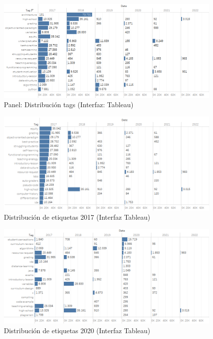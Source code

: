 \documentclass[a4paper, 12pt]{book}
\begin{document}
\begin{figure}[ht]
    \centering
    \includegraphics[width=\textwidth]{img/cse/tags_distrib.png}
    \caption{Panel: Distribución tags (Interfaz: Tableau)}
    \label{figura:dist_tags}
\end{figure}

\begin{figure}[ht]
    \centering
    \includegraphics[width=\textwidth]{img/cse/tags_2017.png}
    \caption{ Distribución de etiquetas 2017 (Interfaz Tableau)}
    \label{figura:tags_2017}
\end{figure}

\begin{figure}[ht]
    \centering
    \includegraphics[width=\textwidth]{img/cse/tags_2020.png}
    \caption{ Distribución de etiquetas 2020 (Interfaz Tableau)}
    \label{figura:tags_2020}
\end{figure}
\end{document}

